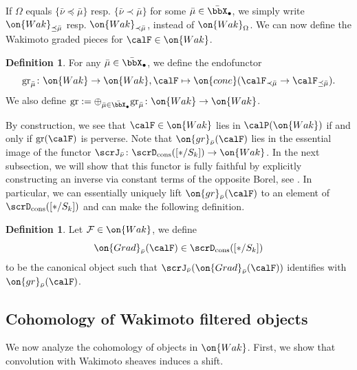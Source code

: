 \documentclass[10pt, reqno]{amsart}
\theoremstyle{plain}
\theoremstyle{definition}
\newtheorem{definition}[theorem]{Definition}
\numberwithin{equation}{section}
\begin{document}
	If $\Omega$ equals $\{\bar \nu \preceq \bar\mu\}$ resp. $\{\bar \nu \prec \bar\mu\}$ for some $\bar\mu\in \bar\bbX_\bullet$, we simply write $\on{Wak}_{\preceq \bar\mu}$ resp. $\on{Wak}_{\prec \bar\mu}$, instead of $\on{Wak}_{\Omega}$. We can now define the Wakimoto graded pieces for $\calF \in \on{Wak}$.
	
	\begin{definition}
		\label{sec:wakimoto-sheaves-graded-wakimoto-functor}
		For any $\bar\mu\in\bar\bbX_\bullet$, we define the endofunctor 
		\begin{equation}
			\mathrm{gr}_{\bar\mu}\colon \on{Wak} \to \on{Wak}, \calF\mapsto\on{cone}(\calF_{\prec\bar\mu}\to \calF_{\preceq\bar\mu}).
		\end{equation}
		We also define $\mathrm{gr}:=\oplus_{\bar\mu\in\bar\bbX_{\bullet}}\mathrm{gr}_{\bar\mu}\colon \on{Wak}\to \on{Wak}$.
	\end{definition}
	
	By construction, we see that $\calF\in \on{Wak}$ lies in $\calP({\on{Wak}})$ if and only if $\mathrm{gr}(\calF)$ is perverse. 
	Note that $\on{gr}_{\bar \nu}(\calF)$ lies in the essential image of the functor $\scrJ_{\bar\nu}\colon \scrD_{\mathrm{cons}}([*/S_k])\to \on{Wak}$. In the next subsection, we will show that this functor is fully faithful by explicitly constructing an inverse via constant terms of the opposite Borel, see . In particular, we can essentially uniquely lift $\on{gr}_{\bar\nu}(\calF)$ to an element of $\scrD_{\mathrm{cons}}([*/S_k])$ and can make the following definition. 
	
	\begin{definition}
		Let $\mathcal{F} \in \on{Wak}$, we define
		\begin{equation}
			\on{Grad}_{\bar\nu}(\calF) \in \scrD_{\mathrm{cons}}([*/S_k])
		\end{equation}
		to be the canonical object such that $\scrJ_{\bar\nu}(\on{Grad}_{\bar\nu}(\calF))$ identifies with $\on{gr}_{\bar\nu}(\calF)$.
	\end{definition}
	
	\subsection{Cohomology of Wakimoto filtered objects}
	\label{sec:cohomology-wak}
	
	We now analyze the cohomology of objects in $\on{Wak}$. First, we show that convolution with Wakimoto sheaves induces a shift.
	
\end{document}
